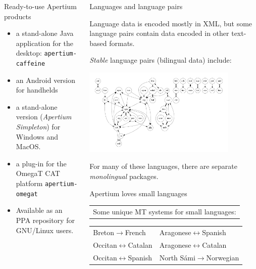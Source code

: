 \documentclass[final]{beamer} %
\newlength{\wideitemsep}
\let\olditem\item
\renewcommand{\item}{\setlength{\itemsep}{\wideitemsep}\olditem}
\begin{document}
\begin{frame}
\begin{columns}
\begin{column}{0.5\textwidth}
\begin{block}{Ready-to-use Apertium products}
\begin{itemize}
  \item a stand-alone Java application for the desktop: \texttt{apertium-caffeine}
  \item an Android version for handhelds
  \item a stand-alone version (\textit{Apertium Simpleton}) for Windows and MacOS.
  \item a plug-in for the OmegaT CAT platform \texttt{apertium-omegat}
\item Available as an PPA repository for GNU/Linux users.
\end{itemize}
\end{block}

\end{column}
\begin{column}{0.5\textwidth}

\begin{block}{Languages and language pairs}

Language data is encoded mostly in XML, but some language pairs contain data encoded in other text-based formats.

\emph{Stable} language pairs (bilingual data) include: 
\begin{center}
\includegraphics[width=0.82\textwidth]{Images/pairs.pdf}
\end{center}
For many of these languages, there are separate \textit{monolingual} packages.
\end{block}


\begin{block}{Apertium loves small languages}
\begin{tabular}{p{14cm}}
Some unique MT systems for small languages:
\end{tabular}
\begin{tabular}{ll}
Breton\(\to\)French & Aragonese\(\leftrightarrow\)Spanish \\
Occitan\(\leftrightarrow\)Catalan  & Aragonese\(\leftrightarrow\)Catalan \\
Occitan\(\leftrightarrow\)Spanish & North Sámi\(\to\)Norwegian \\
\end{tabular}
\end{block}






\end{column}
\end{columns}
\end{frame}
\end{document}
